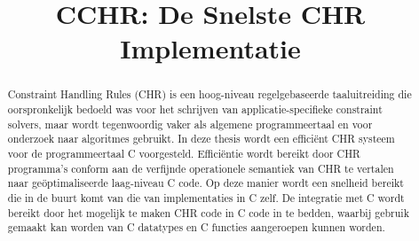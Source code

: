 \documentclass[12pt]{article}
\title{CCHR: De Snelste CHR Implementatie}
\begin{document}
\begin{coverpage} 

% 
% 
% 
% 
%  

\begin{abstract}
Constraint Handling Rules (CHR) is een hoog-niveau regelgebaseerde taaluitreiding die oorspronkelijk bedoeld was voor het schrijven van applicatie-specifieke constraint solvers, maar wordt tegenwoordig vaker als algemene programmeertaal en voor onderzoek naar algoritmes gebruikt. In deze thesis wordt een effici\"ent CHR systeem voor de programmeertaal C voorgesteld. Effici\"entie wordt bereikt door CHR programma's conform aan de verfijnde operationele semantiek van CHR te vertalen naar ge\"optimaliseerde laag-niveau C code. Op deze manier wordt een snelheid bereikt die in de buurt komt van die van implementaties in C zelf. De integratie met C wordt bereikt door het mogelijk te maken CHR code in C code in te bedden, waarbij gebruik gemaakt kan worden van C datatypes en C functies aangeroepen kunnen worden. 
\end{abstract}

\end{coverpage}		%
\end{document}
